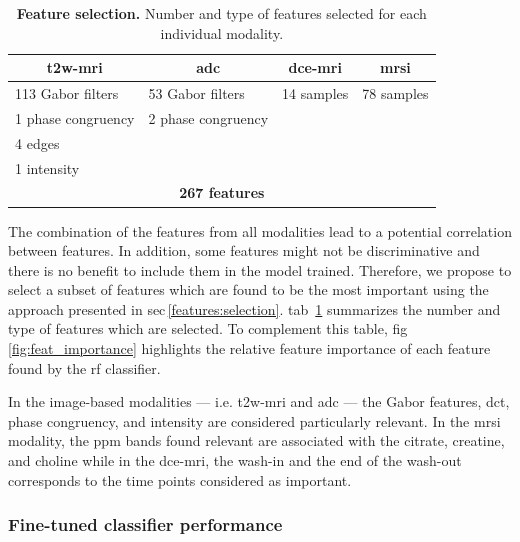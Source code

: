 \documentclass[final,3p,times,twocolumn]{elsarticle}
\begin{document}
\begin{table}
  \caption{\textbf{Feature selection.} Number and type of features selected for
  each individual modality.}
  \centering
  \scriptsize
  \begin{tabular}{llll}
    \toprule
    \multicolumn{1}{c}{\textbf{\acs*{t2w}-\acs*{mri}}} & \multicolumn{1}{c}{\textbf{\acs*{adc}}} & \multicolumn{1}{c}{\textbf{\acs*{dce}-\acs*{mri}}} & \multicolumn{1}{c}{\textbf{\acs*{mrsi}}} \\
    \midrule
    113 Gabor filters & 53 Gabor filters & 14 samples  & 78 samples \\
    1 phase congruency & 2 phase congruency & & \\
    4 edges & & & \\
    1 intensity & & & \\
    \midrule
    \multicolumn{4}{c}{\textbf{267 features}} \\
    \bottomrule
  \end{tabular}
  \label{tab:selfeatocc}
\end{table}

The combination of the features from all modalities lead to a potential
correlation between features. In addition, some features might not be
discriminative and there is no benefit to include them in the model
trained. Therefore, we propose to select a subset of features which are found
to be the most important using the approach presented in
\acs{sec}\,\ref{features:selection}. \Acl{tab}~\ref{tab:selfeatocc} summarizes
the number and type of features which are selected. To complement this table,
\acs{fig}\,\ref{fig:feat_importance} highlights the relative feature importance
of each feature found by the \ac{rf} classifier.

In the image-based modalities --- i.e. \ac{t2w}-\ac{mri} and \ac{adc} --- the
Gabor features, \ac{dct}, phase congruency, and intensity are considered
particularly relevant. In the \ac{mrsi} modality, the \si{ppm} bands found
relevant are associated with the citrate, creatine, and choline while in the
\ac{dce}-\ac{mri}, the wash-in and the end of the wash-out corresponds to the
time points considered as important.

\subsubsection{Fine-tuned classifier performance}\label{exp:classification}
\end{document}
